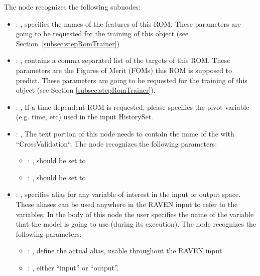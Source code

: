   The  node recognizes the following subnodes:
  \begin{itemize}
    \item {}: , 
      specifies the names of the features of this ROM.         \nb These parameters are going to be
      requested for the training of this object         (see Section~\ref{subsec:stepRomTrainer})

    \item {}: , 
      contains a comma separated list of the targets of this ROM. These parameters         are the
      Figures of Merit (FOMs) this ROM is supposed to predict.         \nb These parameters are
      going to be requested for the training of this         object (see Section
      \ref{subsec:stepRomTrainer}).

    \item {}: , 
      If a time-dependent ROM is requested, please specifies the pivot         variable (e.g. time,
      etc) used in the input HistorySet.

    \item {}: , 
      The text portion of this node needs to contain the name of the  with
               ``CrossValidation``.
      The  node recognizes the following parameters:
        \begin{itemize}
          \item {}: , 
            should be set to 
          \item {}: , 
            should be set to 
      \end{itemize}

    \item {}: , 
      specifies alias for         any variable of interest in the input or output space. These
      aliases can be used anywhere in the RAVEN input to         refer to the variables. In the body
      of this node the user specifies the name of the variable that the model is going to use
      (during its execution).
      The  node recognizes the following parameters:
        \begin{itemize}
          \item {}: , 
            define the actual alias, usable throughout the RAVEN input
          \item {}: , 
            either ``input'' or ``output''.
      \end{itemize}
  \end{itemize}

